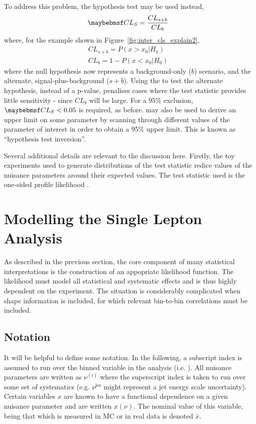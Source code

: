 To address this problem, the \CLs hypothesis test may be used instead,
\begin{equation*}
\CLs = \frac{CL_{s+b}}{CL_{b}}
\end{equation*}
where, for the example shown in Figure~\ref{fig:inter_cls_explain2},
\begin{eqnarray*}
CL_{s+b} = P\left(x > x_0 | H_1\right)\\
CL_b = 1 - P\left(x < x_0 | H_0\right)
\end{eqnarray*}
where the null hypothesis now represents a background-only ($b$) scenario, and
the alternate, signal-plus-background ($s+b$). Using the \CLs to test the
alternate hypothesis, instead of a p-value, penalises cases where the test
statistic provides little sensitivity - since $CL_b$ will be large. For a 95\%
exclusion, $\CLs < 0.05$ is required, as before. \CLs may also be used to derive
an upper limit on some parameter by scanning through different values of the
parameter of interest in order to obtain a 95\% upper limit. This is known as
``hypothesis test inversion''.

Several additional details are relevant to the discussion here. Firstly, the toy
experiments used to generate distributions of the test statistic redice values
of the nuisance parameters around their expected values. The test statistic used
is the one-sided profile likelihood \cite{cl_computation, modified_frequentist, atlas_cms_higgs}.



\section{Modelling the Single Lepton Analysis}
\label{sec:inter_1lepton}
As described in the previous section, the core component of many statistical
interpretations is the construction of an appopriate likelihood function. The
likelihood must model all statistical and systematic effects and is thus highly
dependent on the experiment. The situation is considerably complicated when
shape information is included, for which relevant bin-to-bin correlations must
be included.

\subsection{Notation}
It will be helpful to define some notation. In the following, a subscript index
is assumed to run over the binned variable in the analysis
(i.e. \STlep). All nuisance parameters are written as $\nu^{(i)}$ where the
superscript index is taken to run over some set of systematics
(e.g. $\nu^{\textrm{jes}}$ might represent a jet energy scale
uncertainty). Certain variables $x$ are known to have a functional dependence on a
given nuisance parameter and are written $x(\nu)$. The nominal value of this
variable, being that which is measured in \ac{MC} or in real data is denoted
$\bar{x}$.

